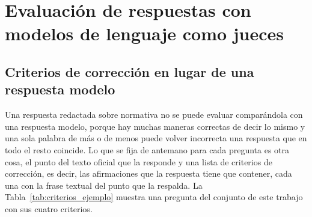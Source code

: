 \documentclass[12pt,a4paper]{report}
\begin{document}
\section{Evaluación de respuestas con modelos de lenguaje como jueces}
\label{sec:mt_eval}

\subsection{Criterios de corrección en lugar de una respuesta modelo}

Una respuesta redactada sobre normativa no se puede evaluar comparándola con una respuesta modelo, porque hay muchas maneras correctas de decir lo mismo y una sola palabra de más o de menos puede volver incorrecta una respuesta que en todo el resto coincide. Lo que se fija de antemano para cada pregunta es otra cosa, el punto del texto oficial que la responde y una lista de criterios de corrección, es decir, las afirmaciones que la respuesta tiene que contener, cada una con la frase textual del punto que la respalda. La Tabla~\ref{tab:criterios_ejemplo} muestra una pregunta del conjunto de este trabajo con sus cuatro criterios.
\end{document}
